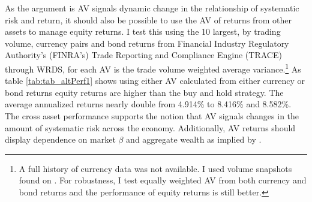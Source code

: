 As the argument is AV signals dynamic change in the relationship of systematic risk and return, it should also be possible to use the AV of returns from other assets to manage equity returns. I test this using the 10 largest, by trading volume, currency pairs and bond returns from Financial Industry Regulatory Authority's (FINRA's) Trade Reporting and Compliance Engine (TRACE) through WRDS, for each AV is the trade volume weighted average variance.\footnote{A full history of currency data was not available. I used volume snapshots found on \citet{most_2013,most_2015,most_2016,most_2018}. For robustness, I test equally weighted AV from both currency and bond returns and the performance of equity returns is still better.} As table \ref{tab:tab_altPerf1} shows using either AV calculated from either currency or bond returns equity returns are higher than the buy and hold strategy. The average annualized returns nearly double from 4.914\% to 8.416\% and 8.582\%. The cross asset performance supports the notion that AV signals changes in the amount of systematic risk across the economy. Additionally, AV returns should display dependence on market $\beta$ and aggregate wealth as implied by \citet{pollet_average_2010}.